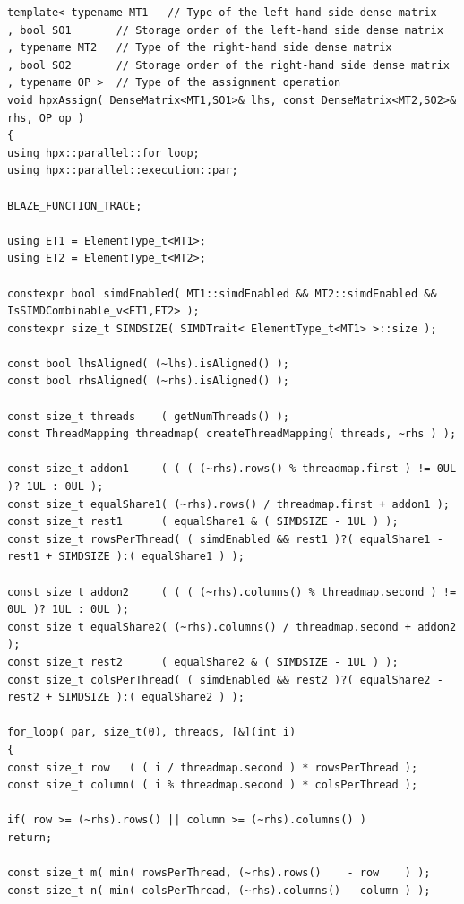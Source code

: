 \begin{lstlisting}[float,floatplacement=H,caption= {Previous implementation of Assign function for HPX backend in Blaze.}, label={old_hpx_backend}]
template< typename MT1   // Type of the left-hand side dense matrix
, bool SO1       // Storage order of the left-hand side dense matrix
, typename MT2   // Type of the right-hand side dense matrix
, bool SO2       // Storage order of the right-hand side dense matrix
, typename OP >  // Type of the assignment operation
void hpxAssign( DenseMatrix<MT1,SO1>& lhs, const DenseMatrix<MT2,SO2>& rhs, OP op )
{
using hpx::parallel::for_loop;
using hpx::parallel::execution::par;

BLAZE_FUNCTION_TRACE;

using ET1 = ElementType_t<MT1>;
using ET2 = ElementType_t<MT2>;

constexpr bool simdEnabled( MT1::simdEnabled && MT2::simdEnabled && IsSIMDCombinable_v<ET1,ET2> );
constexpr size_t SIMDSIZE( SIMDTrait< ElementType_t<MT1> >::size );

const bool lhsAligned( (~lhs).isAligned() );
const bool rhsAligned( (~rhs).isAligned() );

const size_t threads    ( getNumThreads() );
const ThreadMapping threadmap( createThreadMapping( threads, ~rhs ) );

const size_t addon1     ( ( ( (~rhs).rows() % threadmap.first ) != 0UL )? 1UL : 0UL );
const size_t equalShare1( (~rhs).rows() / threadmap.first + addon1 );
const size_t rest1      ( equalShare1 & ( SIMDSIZE - 1UL ) );
const size_t rowsPerThread( ( simdEnabled && rest1 )?( equalShare1 - rest1 + SIMDSIZE ):( equalShare1 ) );

const size_t addon2     ( ( ( (~rhs).columns() % threadmap.second ) != 0UL )? 1UL : 0UL );
const size_t equalShare2( (~rhs).columns() / threadmap.second + addon2 );
const size_t rest2      ( equalShare2 & ( SIMDSIZE - 1UL ) );
const size_t colsPerThread( ( simdEnabled && rest2 )?( equalShare2 - rest2 + SIMDSIZE ):( equalShare2 ) );

for_loop( par, size_t(0), threads, [&](int i)
{
const size_t row   ( ( i / threadmap.second ) * rowsPerThread );
const size_t column( ( i % threadmap.second ) * colsPerThread );

if( row >= (~rhs).rows() || column >= (~rhs).columns() )
return;

const size_t m( min( rowsPerThread, (~rhs).rows()    - row    ) );
const size_t n( min( colsPerThread, (~rhs).columns() - column ) );


\end{lstlisting}
